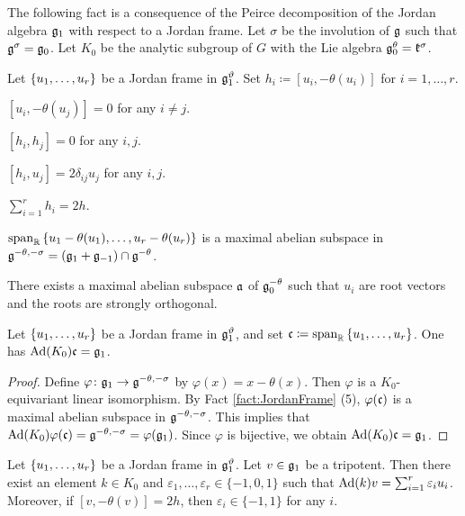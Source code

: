 The following fact is a consequence of the Peirce decomposition \cite[Theorem IV.2.1]{FaKo94} of the Jordan algebra $\mathfrak{g}_1$ with respect to a Jordan frame.
Let $\sigma$ be the involution of $\mathfrak{g}$ such that $\mathfrak{g}^{\sigma} = \mathfrak{g}_0$.
Let $K_0$ be the analytic subgroup of $G$ with the Lie algebra $\mathfrak{g}^\theta_0 = \mathfrak{k}^\sigma$.


\begin{fact} \label{fact:JordanFrame}
	Let $\left\{u_1, \ldots, u_r \right\}$ be a Jordan frame in $\mathfrak{g}_1^{\vartheta}$.
	Set $h_i \coloneq [u_i, -\theta(u_i)]$ for $i = 1, \ldots, r$.
	\begin{enumparen}
		\item $[u_i, -\theta(u_j)] = 0$ for any $i \neq j$.
		\item $[h_i, h_j] = 0$ for any $i, j$.
		\item $[h_i, u_j] = 2\delta_{ij} u_j$ for any $i, j$.
		\item $\sum_{i=1}^r h_i = 2h$.
		\item $\mathrm{span}_{\mathbb{R}}\left\{u_1 - \theta(u_1), \ldots, u_{r} - \theta(u_{r})\right\}$ is a maximal abelian subspace in $\mathfrak{g}^{-\theta, -\sigma} = (\mathfrak{g}_1 + \mathfrak{g}_{-1})\cap \mathfrak{g}^{-\theta}$.
		\item There exists a maximal abelian subspace $\mathfrak{a}$ of $\mathfrak{g}_0^{-\theta}$ such that $u_i$ are root vectors and the roots are strongly orthogonal.
	\end{enumparen}
\end{fact}

\begin{proposition} \label{prop:K0Orbit}
	Let $\left\{u_1, \ldots, u_r \right\}$ be a Jordan frame in $\mathfrak{g}_1^{\vartheta}$, and set $\mathfrak{c}\coloneq \mathrm{span}_{\mathbb{R}}\left\{u_1, \ldots, u_r\right\}$.
	One has $\mathrm{Ad}(K_0)\mathfrak{c} = \mathfrak{g}_1$.
\end{proposition}

\begin{proof}
	Define $\varphi\colon \mathfrak{g}_1 \rightarrow \mathfrak{g}^{-\theta, -\sigma}$ by $\varphi(x) = x -\theta(x)$.
	Then $\varphi$ is a $K_0$-equivariant linear isomorphism.
	By Fact \ref{fact:JordanFrame} (5), $\varphi(\mathfrak{c})$ is a maximal abelian subspace in $\mathfrak{g}^{-\theta, -\sigma}$.
	This implies that $\mathrm{Ad}(K_0)\varphi(\mathfrak{c}) = \mathfrak{g}^{-\theta, -\sigma} = \varphi(\mathfrak{g}_1)$.
	Since $\varphi$ is bijective, we obtain $\mathrm{Ad}(K_0)\mathfrak{c} = \mathfrak{g}_1$.
\end{proof}

\begin{proposition} \label{prop:TripotentAndJordanFrame}
	Let $\left\{u_1, \ldots, u_r \right\}$ be a Jordan frame in $\mathfrak{g}_1^{\vartheta}$.
	Let $v \in \mathfrak{g}_1$ be a tripotent.
	Then there exist an element $k \in K_0$ and $\varepsilon_1, \ldots, \varepsilon_r \in \{-1, 0, 1\}$ such that $\mathrm{Ad}(k)v = \sum_{i=1}^r \varepsilon_i u_i$.
	Moreover, if $[v, -\theta(v)] = 2h$, then $\varepsilon_i \in \{-1, 1\}$ for any $i$.
\end{proposition}


